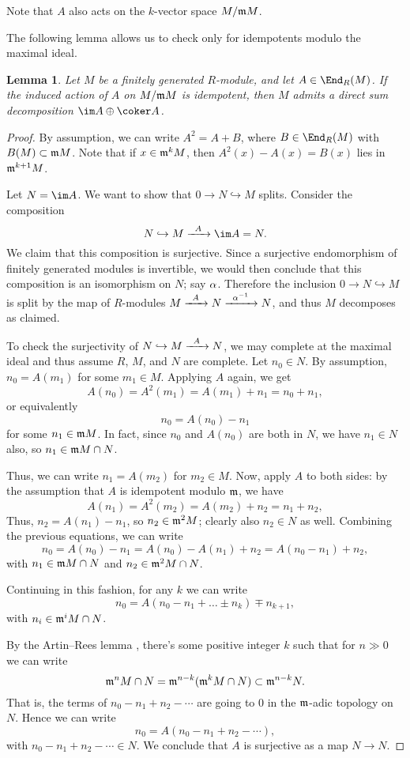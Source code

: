\documentclass[12pt]{article}
\let\inc\hookrightarrow
\theoremstyle{theorem}
\numberwithin{thm}{section}
\newtheorem{lem}[thm]{Lemma}
\theoremstyle{definition}
\begin{document}
Note that $A$ also acts on the $k$-vector space $M/\mathfrak m M$.

The following lemma allows us to check only for idempotents modulo the maximal ideal.

\begin{lem}\label{lem:idemp}
  Let $M$ be a finitely generated $R$-module, and let $A\in\End_R(M)$. If the induced action of $A$ on $M/\mathfrak m M$ is idempotent, then $M$ admits a direct sum decomposition $\im A \oplus \coker A$.
\end{lem}
\begin{proof}
  By assumption, we can write $A^2 = A + B$, where $B\in\End_R(M)$ with $B(M)\subset \mathfrak m M$.
  Note that if $x \in \mathfrak m^kM$, then $A^2(x) - A(x) = B(x)$ lies in $\mathfrak m^{k+1}M$.

  Let $N = \im A$. We want to show that $0 \to N\inc M$ splits. Consider the composition
  \[ N\inc M \xra{A} \im A = N.\]
  We claim that this composition is surjective. Since a surjective endomorphism of finitely generated modules is invertible, we would then conclude that this composition is an isomorphism on $N$; say $\alpha$.
  Therefore the inclusion \( 0 \to N \inc M \) is split by the map of $R$-modules $M\xra{A} N\xra{\a\inv} N$, and thus $M$ decomposes as claimed.

  To check the surjectivity of $N\inc M \xra{A} N$,  we may complete at the maximal ideal and thus assume $R$, $M$, and $N$ are complete. Let $n_0\in N$. By assumption, $n_0=A(m_1)$ for some $m_1\in M$. Applying $A$ again, we get
  \[ A(n_0) = A^2(m_1) = A(m_1) + n_1 = n_0 + n_1, \]
  or equivalently
  \[ n_0 = A(n_0) - n_1 \]
  for some $n_1\in \mathfrak m M$. In fact, since $n_0$ and $A(n_0)$ are both in $N$, we have $n_1\in N$ also, so $n_1\in \mathfrak m M\cap N$.

  Thus, we can write $n_1 = A(m_2)$ for $m_2\in M$.
  Now, apply $A$ to both sides: by the assumption that $A$ is idempotent modulo $\mathfrak m$, we have
  \[ A(n_1)=A^2(m_2) = A(m_2) + n_2 = n_1+n_2, \]
  Thus, $n_2=A(n_1)-n_1$, so $n_2\in \mathfrak m^2M$; clearly also $n_2\in N$ as well.
  Combining the previous equations, we can write
  \[ n_0 = A(n_0) - n_1 = A(n_0) - A(n_1) + n_2 = A(n_0 - n_1) + n_2, \]
  with $n_1\in \mathfrak m M\cap N$ and $n_2\in \mathfrak m^2M\cap N$.

  Continuing in this fashion, for any $k$ we can write
  \[ n_0=A(n_0-n_1+\dots \pm n_k) \mp n_{k+1}, \]
  with $n_i \in \mathfrak m^i M\cap N$.

  By the Artin--Rees lemma \cite[Lemma~5.1]{Eisenbud95}, there's some positive integer $k$ such that for $n\gg0$ we can write
  \[ \mathfrak m^n M\cap N = \mathfrak m^{n-k} ( \mathfrak m^kM\cap N)\subset \mathfrak m^{n-k} N. \]
  That is, the terms of $n_0-n_1+n_2-\cdots$ are going to 0 in the $\mathfrak m$-adic topology on $N$. Hence we can write
  \[ n_0=A(n_0-n_1+n_2-\cdots), \]
  with $n_0-n_1+n_2-\cdots\in N$. We conclude that $A$ is surjective as a map $N\to N$.
\end{proof}
\end{document}
